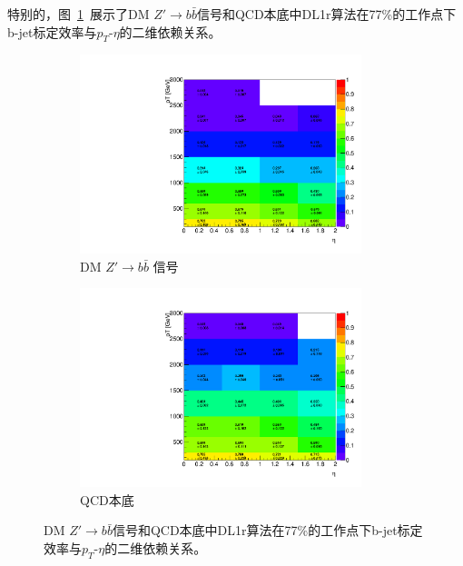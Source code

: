 特别的，图~\ref{fig:btag2D_fix77}~展示了DM $Z\prime\rightarrow b\bar{b}$信号和QCD本底中DL1r算法在77\%的工作点下b-jet标定效率与$p_{T}$-$\eta$的二维依赖关系。

\begin{figure}[!thbp]
  \begin{subfigure}{.5\textwidth}
  \centering
  \includegraphics[width=0.9\textwidth]{figuresDijet/02-Selection/Btag_pteta2D_Fix77_DMZprime.pdf}
  \caption{DM $Z\prime \rightarrow  b\bar{b}$ 信号}
  \end{subfigure}
  \begin{subfigure}{.5\textwidth}
  \centering
  \includegraphics[width=0.9\textwidth]{figuresDijet/02-Selection/Btag_pteta_2D_Fix77_QCD.pdf}
  \caption{QCD本底}
  \end{subfigure}
\caption{
DM $Z\prime\rightarrow b\bar{b}$信号和QCD本底中DL1r算法在77\%的工作点下b-jet标定效率与$p_{T}$-$\eta$的二维依赖关系。
}
 \label{fig:btag2D_fix77}
\end{figure}



